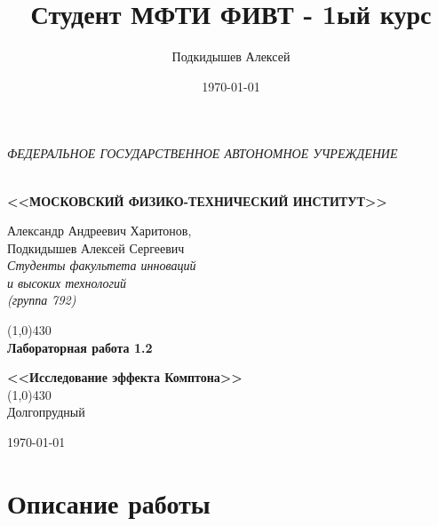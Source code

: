 \documentclass[a4paper,12pt]{article}
\author{Подкидышев Алексей}
\title{Студент МФТИ ФИВТ - 1ый курс}
\date{\today}
\theoremstyle{plain} %
\theoremstyle{definition} %
\theoremstyle{remark} %
\renewcommand{\headrulewidth}{0mm}  %
\begin{document}

\begin{center}
	\textit{\MakeTextUppercase{федеральное государственное автономное учреждение}}
		
	\vspace{0.5ex}
	
	\textbf{ \\ \MakeTextUppercase{<<Московский Физико-технический институт>>}}
\end{center}
\vspace{13ex}
\begin{flushright}
	\noindent
	{Александр Андреевич Харитонов,\\
	Подкидышев Алексей Сергеевич}
	\\
	\textit{Студенты факультета инноваций\\ и высоких технологий\\(группа 792)}
\end{flushright}
\begin{center}
	\vspace{23ex}
	\line(1,0){430}\\[4ex]
	{\LARGE\textbf{Лабораторная работа 1.2}}
	\vspace{2ex}
	
		
	\textbf{\large{<<Исследование эффекта Комптона>>}}\\[3ex]
	\line(1,0){430}\\[5ex]
	\vfill
	Долгопрудный 
	
	{\today}
\end{center}

\newpage
\newpage
\renewcommand{\headrulewidth}{1pt}

\section{Описание работы}
\end{document}
